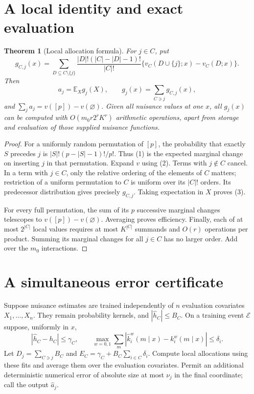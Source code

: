 \documentclass[11pt,a4paper]{article}
\newtheorem{theorem}{Theorem}[section]
\theoremstyle{definition}
\theoremstyle{remark}
\newcommand{\E}{\mathbb E}
\begin{document}
\section{A local identity and exact evaluation}
\begin{theorem}[Local allocation formula]
For $j\in C$, put
\[
 g_{C,j}(x)=\sum_{D\subseteq C\setminus\{j\}}
 \frac{|D|!(|C|-|D|-1)!}{|C|!}
       \{v_C(D\cup\{j\};x)-v_C(D;x)\}.
\]
Then
\[
 a_j=\E_X g_j(X),\qquad
 g_j(x)=\sum_{C\ni j}g_{C,j}(x), \tag{3}
\]
and $\sum_ja_j=v([p])-v(\varnothing)$. Given all nuisance values at one $x$, all $g_j(x)$ can be computed with $O(m_0r2^rK^r)$ arithmetic operations, apart from storage and evaluation of those supplied nuisance functions.
\end{theorem}
\begin{proof}
For a uniformly random permutation of $[p]$, the probability that exactly $S$ precedes $j$ is $|S|!(p-|S|-1)!/p!$. Thus (1) is the expected marginal change on inserting $j$ in that permutation. Expand $v$ using (2). Terms with $j\notin C$ cancel. In a term with $j\in C$, only the relative ordering of the elements of $C$ matters; restriction of a uniform permutation to $C$ is uniform over its $|C|!$ orders. Its predecessor distribution gives precisely $g_{C,j}$. Taking expectation in $X$ proves (3).

For every full permutation, the sum of its $p$ successive marginal changes telescopes to $v([p])-v(\varnothing)$. Averaging proves efficiency. Finally, each of at most $2^{|C|}$ local values requires at most $K^{|C|}$ summands and $O(r)$ operations per product. Summing its marginal changes for all $j\in C$ has no larger order. Add over the $m_0$ interactions.
\end{proof}

\section{A simultaneous error certificate}
Suppose nuisance estimates are trained independently of $n$ evaluation covariates $X_1,\ldots,X_n$. They remain probability kernels, and $|\hat h_C|\le B_C$. On a training event $\mathcal E$ suppose, uniformly in $x$,
\[
 |\hat h_C-h_C|\le\gamma_C,
 \qquad
 \max_{w=0,1}\sum_m|\hat k_i^w(m\mid x)-k_i^w(m\mid x)|\le\delta_i.
 \tag{4}
\]
Let $D_j=\sum_{C\ni j}B_C$ and
$E_C=\gamma_C+B_C\sum_{i\in C}\delta_i$.
Compute local allocations using these fits and average them over the evaluation covariates. Permit an additional deterministic numerical error of absolute size at most $\nu_j$ in the final coordinate; call the output $\hat a_j$.
\end{document}
